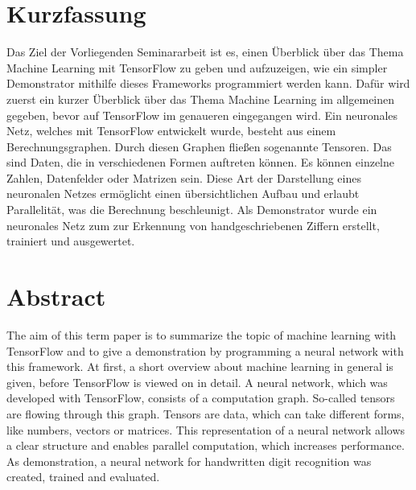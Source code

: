 \section*{Kurzfassung}
Das Ziel der Vorliegenden Seminararbeit ist es, einen Überblick über das Thema Machine Learning mit TensorFlow zu geben und aufzuzeigen, wie ein simpler Demonstrator mithilfe dieses Frameworks programmiert werden kann. Dafür wird zuerst ein kurzer Überblick über das Thema Machine Learning im allgemeinen gegeben, bevor auf TensorFlow im genaueren eingegangen wird. Ein neuronales Netz, welches mit TensorFlow entwickelt wurde, besteht aus einem Berechnungsgraphen. Durch diesen Graphen fließen sogenannte Tensoren. Das sind Daten, die in verschiedenen Formen auftreten können. Es können einzelne Zahlen, Datenfelder oder Matrizen sein. Diese Art der Darstellung eines neuronalen Netzes ermöglicht einen übersichtlichen Aufbau und erlaubt Parallelität, was die Berechnung beschleunigt. Als Demonstrator wurde ein neuronales Netz zum zur Erkennung von handgeschriebenen Ziffern erstellt, trainiert und ausgewertet.

\section*{Abstract}
The aim of this term paper is to summarize the topic of machine learning with TensorFlow and to give a demonstration by programming a neural network with this framework. At first, a short overview about machine learning in general is given, before TensorFlow is viewed on in detail. A neural network, which was developed with TensorFlow, consists of a computation graph. So-called tensors are flowing through this graph. Tensors are data, which can take different forms, like numbers, vectors or matrices. This representation of a neural network allows a clear structure and enables parallel computation, which increases performance. As demonstration, a neural network for handwritten digit recognition was created, trained and evaluated.
